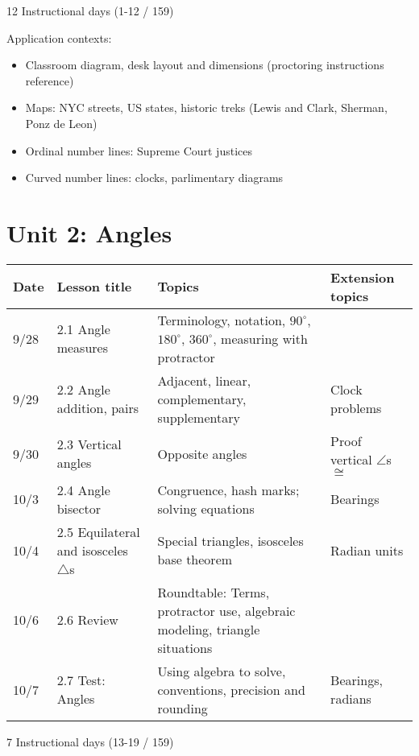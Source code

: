 12 Instructional days (1-12 / 159)

Application contexts: 
\begin{itemize}
  \item Classroom diagram, desk layout and dimensions (proctoring instructions reference)
  \item Maps: NYC streets, US states, historic treks (Lewis and Clark, Sherman, Ponz de Leon)
  \item Ordinal number lines: Supreme Court justices
  \item Curved number lines: clocks, parlimentary diagrams
\end{itemize}


\newpage
\section*{Unit 2: Angles}
\begin{tabular}{|p{0.9cm}|p{4cm}|p{7cm}|p{5cm}|}
  \hline
  Date & Lesson title & Topics  & Extension topics \\
  \hline
  9/28 & 2.1 Angle measures & Terminology, notation, $90^\circ$, $180^\circ$, $360^\circ$, measuring with protractor &  \\
  \hline
  9/29 & 2.2 Angle addition, pairs & Adjacent, linear, complementary, supplementary & Clock problems \\
  \hline
  9/30 & 2.3 Vertical angles & Opposite angles & Proof vertical $\angle$s $\cong$ \\
  \hline
  10/3 & 2.4 Angle bisector & Congruence, hash marks; solving equations & Bearings \\
  \hline
  10/4 & 2.5 Equilateral and isosceles $\triangle$s & Special triangles, isosceles base theorem & Radian units \\
  \hline
  10/6 & 2.6 Review & Roundtable: Terms, protractor use, algebraic modeling, triangle situations & \\
  \hline
  10/7 & 2.7 Test: Angles & Using algebra to solve, conventions, precision and rounding & Bearings, radians \\
  \hline

\end{tabular} \par \vspace*{0.3cm}
7 Instructional days (13-19 / 159)


